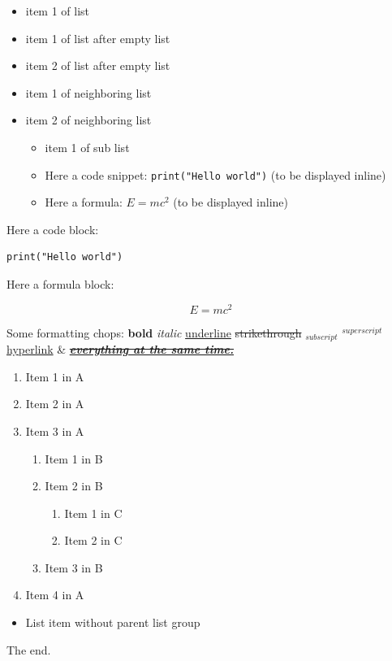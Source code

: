 \documentclass[11pt,a4paper]{article}
\begin{document}
\begin{itemize}
\item item 1 of list
\end{itemize}

\begin{itemize}
\item item 1 of list after empty list
\item item 2 of list after empty list
\end{itemize}

\begin{itemize}
\item item 1 of neighboring list
\item item 2 of neighboring list
  \begin{itemize}
\item item 1 of sub list
\item Here a code snippet: \texttt{print("Hello world")} (to be displayed inline)
\item Here a formula: $E=mc^2$ (to be displayed inline)
  \end{itemize}
\end{itemize}

Here a code block:

\begin{verbatim}
print("Hello world")
\end{verbatim}

Here a formula block:

$$E=mc^2$$



Some formatting chops: \textbf{bold} \textit{italic} \underline{underline} \sout{strikethrough} $_{subscript}$ $^{superscript}$ \href{.}{hyperlink} \& \href{https://github.com/DS4SD/docling}{\sout{\underline{\textit{\textbf{everything at the same time.}}}}}

\begin{enumerate}
\item Item 1 in A
\item Item 2 in A
\item Item 3 in A
  \begin{enumerate}
\item Item 1 in B
\item Item 2 in B
    \begin{enumerate}
\item Item 1 in C
\item Item 2 in C
    \end{enumerate}
\item Item 3 in B
  \end{enumerate}
\item Item 4 in A
\end{enumerate}

\begin{itemize}
\item List item without parent list group
\end{itemize}

The end.
\end{document}
